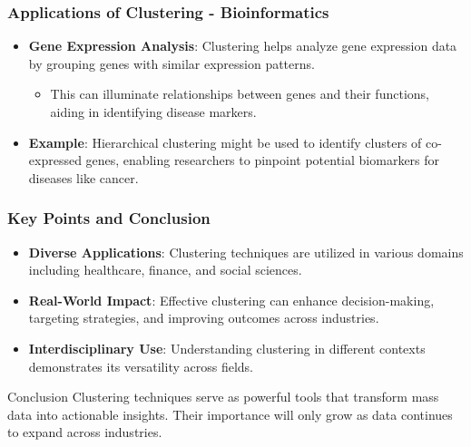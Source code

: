 \documentclass{beamer}
\begin{document}
\begin{frame}[fragile]
    \frametitle{Applications of Clustering - Bioinformatics}
    \begin{itemize}
        \item \textbf{Gene Expression Analysis}: Clustering helps analyze gene expression data by grouping genes with similar expression patterns.
        \begin{itemize}
            \item This can illuminate relationships between genes and their functions, aiding in identifying disease markers.
        \end{itemize}
        \item \textbf{Example}: Hierarchical clustering might be used to identify clusters of co-expressed genes, enabling researchers to pinpoint potential biomarkers for diseases like cancer.
    \end{itemize}
\end{frame}

\begin{frame}[fragile]
    \frametitle{Key Points and Conclusion}
    \begin{itemize}
        \item \textbf{Diverse Applications}: Clustering techniques are utilized in various domains including healthcare, finance, and social sciences.
        \item \textbf{Real-World Impact}: Effective clustering can enhance decision-making, targeting strategies, and improving outcomes across industries.
        \item \textbf{Interdisciplinary Use}: Understanding clustering in different contexts demonstrates its versatility across fields.
    \end{itemize}
    \begin{block}{Conclusion}
        Clustering techniques serve as powerful tools that transform mass data into actionable insights. Their importance will only grow as data continues to expand across industries.
    \end{block}
\end{frame}
\end{document}
